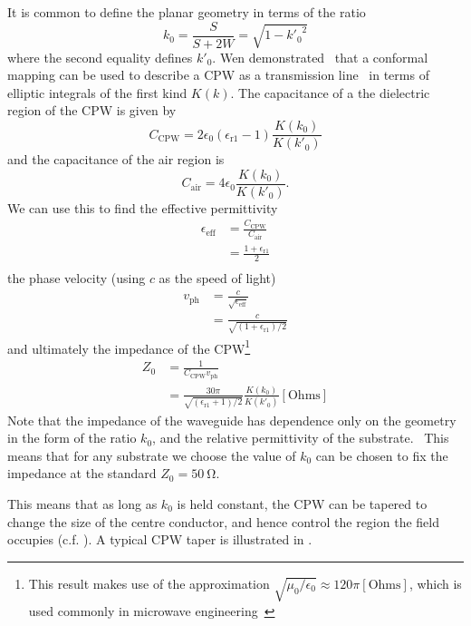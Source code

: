 It is common to define the planar geometry in terms of the
ratio~\cite{1127105, Simons2004}
\begin{equation}
  k_0 = \frac{S}{S+2W} = \sqrt{1-{k'_0}^2}
  \label{eqn:k0def}
\end{equation}
where the second equality defines $k'_0$.
%
Wen demonstrated~\cite{1127105} that a conformal mapping can be used to describe
a CPW as a transmission line~\cite{Jackson1975} in terms of elliptic integrals
of the first kind $K(k)$. The capacitance of a the dielectric region of the CPW
is given by
\begin{equation}
  C_\mathrm{CPW} = 2\epsilon_0(\epsilon_\mathrm{r1}-1)\frac{K(k_0)}{K(k'_0)}
\end{equation}
and the capacitance of the air region is
\begin{equation}
  C_\mathrm{air} = 4\epsilon_0 \frac{K(k_0)}{K(k'_0)}.
\end{equation}
We can use this to find the effective permittivity 
\begin{align}
  \epsilon_\mathrm{eff} &= \frac{C_\mathrm{CPW}}{C_\mathrm{air}} \\
    &= \frac{1+ \epsilon_\mathrm{r1}}{2} \\
\end{align}
the phase velocity (using $c$ as the speed of light)
\begin{align}
  v_\mathrm{ph} &= \frac{c}{\sqrt{\epsilon_\mathrm{eff}}} \\
    &= \frac{c}{\sqrt{(1 + \epsilon_\mathrm{r1})/2}}
\end{align}
and ultimately the impedance of the CPW\footnote{This result makes use of the
approximation $\sqrt{\mu_0/\epsilon_0}\approx120\pi\mathrm{[Ohms]}$, which is
used commonly in microwave engineering~}
\begin{align}
  Z_0 &= \frac{1}{C_\mathrm{CPW} v_\mathrm{ph}} \\
    &= \frac{30 \pi}{\sqrt{(\epsilon_\mathrm{r1}+1)/2}} \frac{K(k_0)}{K(k'_0)}
    \mathrm{[Ohms]}
\end{align}
Note that the impedance of the waveguide has dependence only on the geometry in
the form of the ratio $k_0$, and the relative permittivity of the
substrate.~\cite{Simons2004} This means that for any substrate we choose the
value of $k_0$ can be chosen to fix the impedance at the standard $Z_0 =
\SI{50}{\ohm}$.

This means that as long as $k_0$ is held constant,
the CPW can be tapered to change the size of the centre conductor, and hence
control the region the field occupies (c.f. ).
A typical CPW taper is illustrated in
.~

